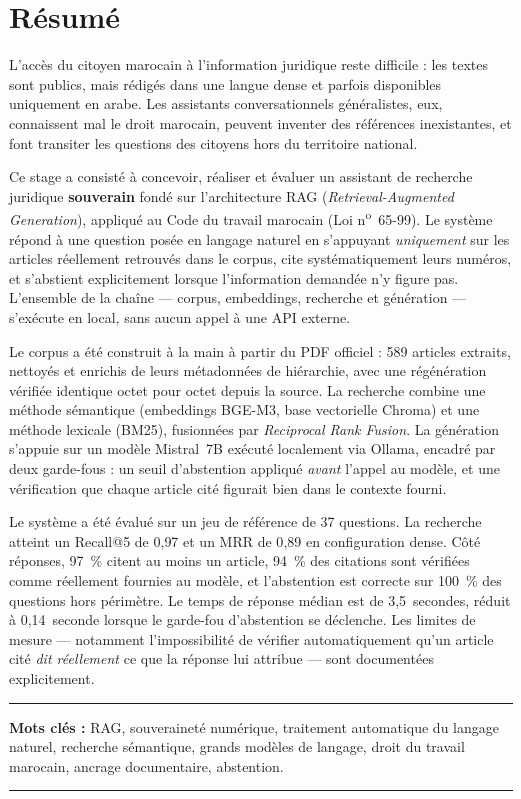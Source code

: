 \chapter*{Résumé}

L'accès du citoyen marocain à l'information juridique reste difficile : les textes sont
publics, mais rédigés dans une langue dense et parfois disponibles uniquement en arabe. Les
assistants conversationnels généralistes, eux, connaissent mal le droit marocain, peuvent
inventer des références inexistantes, et font transiter les questions des citoyens hors du
territoire national.

Ce stage a consisté à concevoir, réaliser et évaluer un assistant de recherche juridique
\textbf{souverain} fondé sur l'architecture RAG (\textit{Retrieval-Augmented Generation}),
appliqué au Code du travail marocain (Loi n\textsuperscript{o}~65-99). Le système répond à une
question posée en langage naturel en s'appuyant \emph{uniquement} sur les articles réellement
retrouvés dans le corpus, cite systématiquement leurs numéros, et s'abstient explicitement
lorsque l'information demandée n'y figure pas. L'ensemble de la chaîne --- corpus, embeddings,
recherche et génération --- s'exécute en local, sans aucun appel à une API externe.

Le corpus a été construit à la main à partir du PDF officiel : 589 articles extraits, nettoyés
et enrichis de leurs métadonnées de hiérarchie, avec une régénération vérifiée identique octet
pour octet depuis la source. La recherche combine une méthode sémantique (embeddings BGE-M3,
base vectorielle Chroma) et une méthode lexicale (BM25), fusionnées par \textit{Reciprocal Rank
Fusion}. La génération s'appuie sur un modèle Mistral~7B exécuté localement via Ollama, encadré
par deux garde-fous : un seuil d'abstention appliqué \emph{avant} l'appel au modèle, et une
vérification que chaque article cité figurait bien dans le contexte fourni.

Le système a été évalué sur un jeu de référence de 37 questions. La recherche atteint un
Recall@5 de 0{,}97 et un MRR de 0{,}89 en configuration dense. Côté réponses, 97~\% citent au
moins un article, 94~\% des citations sont vérifiées comme réellement fournies au modèle, et
l'abstention est correcte sur 100~\% des questions hors périmètre. Le temps de réponse médian
est de 3{,}5~secondes, réduit à 0{,}14~seconde lorsque le garde-fou d'abstention se déclenche.
Les limites de mesure --- notamment l'impossibilité de vérifier automatiquement qu'un article
cité \emph{dit réellement} ce que la réponse lui attribue --- sont documentées explicitement.

\noindent\rule[2pt]{\textwidth}{0.5pt}

{\textbf{Mots clés :}}
RAG, souveraineté numérique, traitement automatique du langage naturel, recherche sémantique,
grands modèles de langage, droit du travail marocain, ancrage documentaire, abstention.
\\
\noindent\rule[2pt]{\textwidth}{0.5pt}
